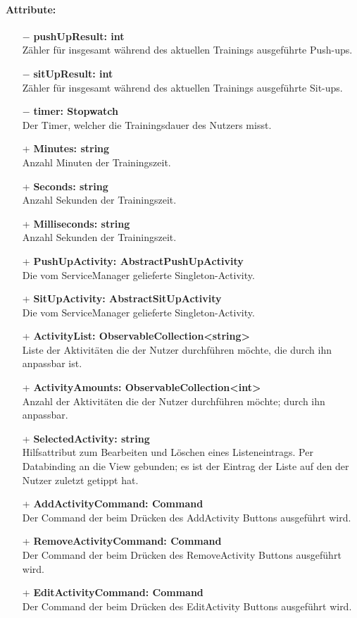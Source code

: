 \documentclass[a4paper,12pt]{article}
\begin{document}
\paragraph{Attribute:}
\begin{itemize}
	\item[$-$] \textbf{pushUpResult: int} \\ Zähler für insgesamt während des aktuellen Trainings ausgeführte Push-ups. 
	\item[$-$] \textbf{sitUpResult: int} \\ Zähler für insgesamt während des aktuellen Trainings ausgeführte Sit-ups. 
	\item[$-$] \textbf{timer: Stopwatch} \\ Der Timer, welcher die Trainingsdauer des Nutzers misst. 
	\item[+] \textbf{Minutes: string} \\ Anzahl Minuten der Trainingszeit. 
	\item[+] \textbf{Seconds: string} \\  Anzahl Sekunden der Trainingszeit. 
	\item[+] \textbf{Milliseconds: string} \\ Anzahl Sekunden der Trainingszeit. 
	\item[+] \textbf{PushUpActivity: AbstractPushUpActivity} \\ Die vom ServiceManager gelieferte Singleton-Activity.
	\item[+] \textbf{SitUpActivity: AbstractSitUpActivity} \\ Die vom ServiceManager gelieferte Singleton-Activity.
	\item[+] \textbf{ActivityList: ObservableCollection<string>} \\ Liste der Aktivitäten die der Nutzer durchführen möchte, die durch ihn anpassbar ist. 
	\item[+] \textbf{ActivityAmounts: ObservableCollection<int>} \\ Anzahl der Aktivitäten die der Nutzer durchführen möchte; durch ihn anpassbar. 
	\item[+] \textbf{SelectedActivity: string} \\ Hilfsattribut zum Bearbeiten und Löschen eines Listeneintrags. Per Databinding an die View gebunden; es ist der Eintrag der Liste auf den der Nutzer zuletzt getippt hat. 
	\item[+] \textbf{AddActivityCommand: Command} \\ Der Command der beim Drücken des AddActivity Buttons ausgeführt wird. 
	\item[+] \textbf{RemoveActivityCommand: Command} \\ Der Command der beim Drücken des RemoveActivity Buttons ausgeführt wird. 
	\item[+] \textbf{EditActivityCommand: Command} \\ Der Command der beim Drücken des EditActivity Buttons ausgeführt wird. 
\end{itemize}
\end{document}
